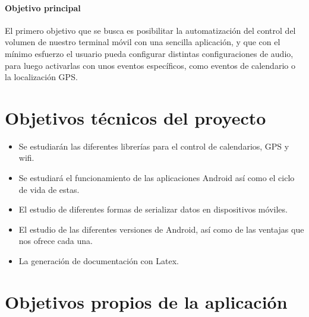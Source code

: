 
\paragraph{Objetivo principal}


El primero objetivo que se busca es posibilitar la automatización del control del volumen de nuestro terminal móvil con una sencilla aplicación, y que con el mínimo esfuerzo el usuario pueda configurar distintas configuraciones de audio, para luego activarlas con unos eventos específicos, como eventos de calendario o la localización GPS.

\section{Objetivos técnicos del proyecto}


\begin{itemize}
	\item Se estudiarán las diferentes librerías para el control de calendarios, GPS y wifi.
	\item Se estudiará el funcionamiento de las aplicaciones Android así como el ciclo de vida de estas.
	\item El estudio de diferentes formas de serializar datos en dispositivos móviles.
	\item El estudio de las diferentes versiones de Android, así como de las ventajas que nos ofrece cada una.
	\item La generación de documentación con Latex.
\end{itemize}

\section{Objetivos propios de la aplicación}


